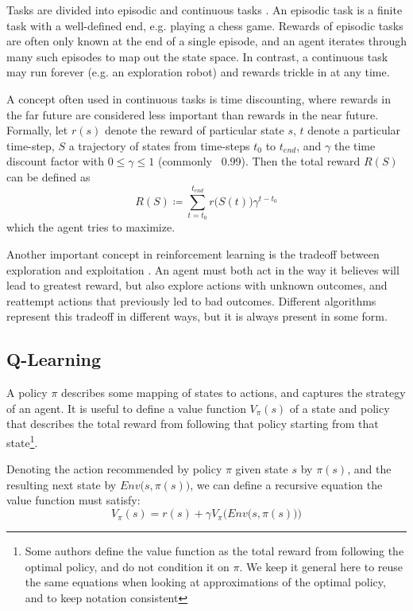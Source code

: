 Tasks are divided into episodic and continuous tasks \cite[chapters 3.3 \& 3.4]{Sutton}. An episodic task is a finite task with a well-defined end, e.g. playing a chess game. Rewards of episodic tasks are often only known at the end of a single episode, and an agent iterates through many such episodes to map out the state space. In contrast, a continuous task may run forever (e.g. an exploration robot) and rewards trickle in at any time.

A concept often used in continuous tasks is time discounting, where rewards in the far future are considered less important than rewards in the near future. Formally, let $r(s)$ denote the reward of particular state $s$, $t$ denote a particular time-step, $S$ a trajectory of states from time-steps $t_0$ to $t_{end}$, and $\gamma$ the time discount factor with $0 \leq \gamma \leq 1$ (commonly ~0.99). Then the total reward $R(S)$ can be defined as
\begin{equation}
    R(S) \coloneqq \sum_{t=t_0}^{t_{end}}{r\big(S(t)\big)\gamma^{t-t_0}}
\end{equation}
which the agent tries to maximize.

Another important concept in reinforcement learning is the tradeoff between exploration and exploitation \cite[chapter 2.1]{Sutton}. An agent must both act in the way it believes will lead to greatest reward, but also explore actions with unknown outcomes, and reattempt actions that previously led to bad outcomes. Different algorithms represent this tradeoff in different ways, but it is always present in some form.

\subsection{Q-Learning}
A policy $\pi$ describes some mapping of states to actions, and captures the strategy of an agent. It is useful to define a value function $V_{\pi}(s)$ of a state and policy that describes the total reward from following that policy starting from that state\footnote{Some authors define the value function as the total reward from following the optimal policy, and do not condition it on $\pi$. We keep it general here to reuse the same equations when looking at approximations of the optimal policy, and to keep notation consistent}.

Denoting the action recommended by policy $\pi$ given state $s$ by $\pi(s)$, and the resulting next state by $Env\big(s, \pi(s)\big)$, we can define a recursive equation the value function must satisfy:
\begin{equation}
\label{bellman_value}
    V_{\pi}(s) = r(s) + \gamma V_{\pi} \Big(Env\big(s, \pi(s)\big)\Big)
\end{equation}

